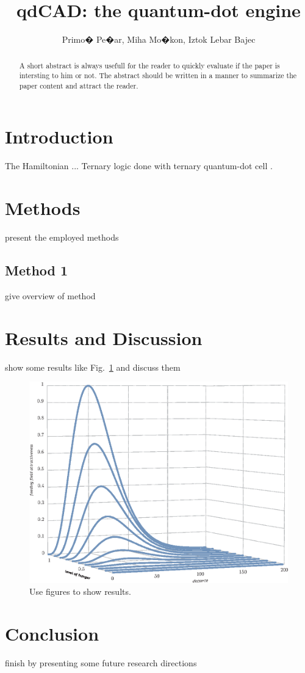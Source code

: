 \documentclass[seminar]{FRIreport}
\newcommand{\figref}[1]{Fig.~\ref{#1}}
\begin{document}
\title{qdCAD: the quantum-dot engine}

\author[P {Pe�ar} \etal]{{Primo�} {Pe�ar}, Miha Mo�kon, Iztok Lebar Bajec}

\address{Group 1}

\begin{abstract}
A short abstract is always usefull for the reader to quickly evaluate if the paper is intersting to him or not. The abstract should be written in a manner to summarize the paper content and attract the reader.

\end{abstract}



%
\section{Introduction}
%
The Hamiltonian ... Ternary logic done with ternary quantum-dot cell \cite{lebar_bajec:2005c,lebar_bajec:2006a,lebar_bajec:2006b}.

%
\section{Methods}
%
present the employed methods

%
\subsection{Method 1}
give overview of method 

%
\section{Results and Discussion}
%
show some results like \figref{fig.Df} and discuss them
%
\begin{figure}[htb]
\includegraphics{figDf.eps}
\caption{Use figures to show results.}
\label{fig.Df}
\end{figure}
%

%
\section{Conclusion}
%
finish by presenting some future research directions

%
\References
%


\end{document}
